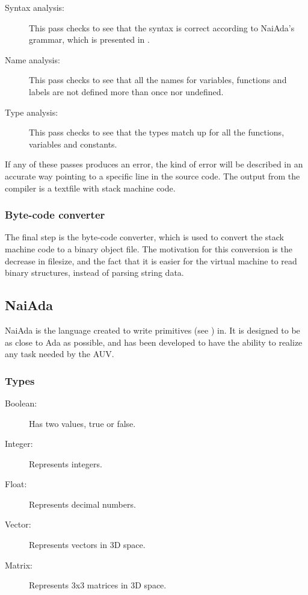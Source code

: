 \begin{description}
\item[Syntax analysis:] This pass checks to see that the syntax is correct according to NaiAda's grammar, which is presented in .
\item[Name analysis:] This pass checks to see that all the names for variables, functions and labels are not defined more than once nor undefined.
\item[Type analysis:] This pass checks to see that the types match up for all the functions, variables and constants.
\end{description}

If any of these passes produces an error, the kind of error will be described in an accurate way pointing to a specific line in the source code. The output from the compiler is a textfile with stack machine code.

\subsubsection{Byte-code converter}
The final step is the byte-code converter, which is used to convert the stack machine code to a binary object file. The motivation for this conversion is the decrease in filesize, and the fact that it is easier for the virtual machine to read binary structures, instead of parsing string data.


\subsection{NaiAda}
\label{sec:naiada}
NaiAda is the language created to write primitives (see ) in. It is designed to be as close to Ada as possible, and has been developed to have the ability to realize any task needed by the AUV.
\subsubsection{Types}
\begin{description}
\item[Boolean:] Has two values, true or false.
\item[Integer:] Represents integers.
\item[Float:] Represents decimal numbers.
\item[Vector:] Represents vectors in 3D space.
\item[Matrix:] Represents 3x3 matrices in 3D space.
\end{description}

